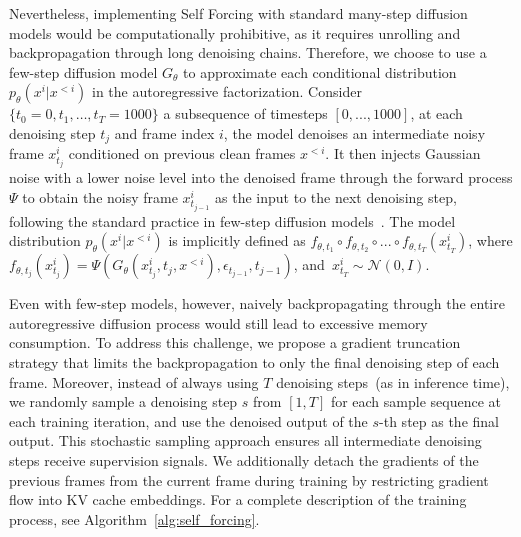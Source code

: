 \documentclass{article}
\begin{document}
Nevertheless, implementing Self Forcing with standard many-step diffusion models would be computationally prohibitive, as it requires unrolling and backpropagation through long denoising chains.
Therefore, we choose to use a few-step diffusion model $G_\theta$ to approximate each conditional distribution $p_\theta(x^i|x^{<i})$ in the autoregressive factorization. Consider $\{t_0=0,t_1, \dots, t_{T}=1000\}$ a subsequence of timesteps $[0, ..., 1000]$,
at each denoising step $t_j$ and frame index $i$, the model denoises an intermediate noisy frame \( x^i_{t_j} \) conditioned on previous clean frames \( x^{<i} \). It then injects Gaussian noise with a lower noise level into the denoised frame through the forward process $\Psi$ to obtain the noisy frame \( x^i_{t_{j - 1}} \) as the input to the next denoising step, following the standard practice in few-step diffusion models~\cite{song2023consistency,yin2024improved}.
The model distribution $p_\theta(x^i|x^{<i})$ is implicitly defined as $ f_{\theta,t_1} \circ f_{\theta,t_2} \circ ... \circ f_{\theta,t_T} (x^i_{t_T})$, where $f_{\theta,t_j}(x_{t_j}^i)=\Psi(G_\theta(x^i_{t_j}, t_{j},  x^{<i}), \epsilon_{t_{j-1}}, t_{j-1})$, \mbox{and $ x^i_{t_{T}} \sim \mathcal{N}(0, I)$}.




Even with few-step models, however, naively backpropagating through the entire autoregressive diffusion process would still lead to excessive memory consumption.
To address this challenge, we propose a gradient truncation strategy that limits the backpropagation to only the final denoising step of each frame. Moreover, instead of always using $T$ denoising steps~(as in inference time), we randomly sample a denoising step $s$ from $[1, T]$ for each sample sequence at each training iteration, and use the denoised output of the $s$-th step as the final output.
This stochastic sampling approach ensures all intermediate denoising steps receive supervision signals.
We additionally detach the gradients of the previous frames from the current frame during training by restricting gradient flow into KV cache embeddings. For a complete description of the training process, see Algorithm~\ref{alg:self_forcing}.
\end{document}
